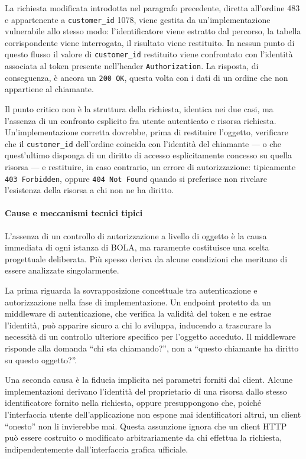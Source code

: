 La richiesta modificata introdotta nel paragrafo precedente, diretta all'ordine 483 e appartenente
a \texttt{customer\_id} 1078, viene gestita da un'implementazione vulnerabile allo stesso modo:
l'identificatore viene estratto dal percorso, la tabella corrispondente viene interrogata, il
risultato viene restituito. In nessun punto di questo flusso il valore di \texttt{customer\_id}
restituito viene confrontato con l'identità associata al token presente nell'header
\texttt{Authorization}. La risposta, di conseguenza, è ancora un \texttt{200 OK}, questa volta con
i dati di un ordine che non appartiene al chiamante.

Il punto critico non è la struttura della richiesta, identica nei due casi, ma l'assenza di un
confronto esplicito fra utente autenticato e risorsa richiesta. Un'implementazione corretta
dovrebbe, prima di restituire l'oggetto, verificare che il \texttt{customer\_id} dell'ordine
coincida con l'identità del chiamante --- o che quest'ultimo disponga di un diritto di accesso
esplicitamente concesso su quella risorsa --- e restituire, in caso contrario, un errore di
autorizzazione: tipicamente \texttt{403 Forbidden}, oppure \texttt{404 Not Found} quando si
preferisce non rivelare l'esistenza della risorsa a chi non ne ha diritto.

\paragraph{Cause e meccanismi tecnici tipici}

L'assenza di un controllo di autorizzazione a livello di oggetto è la causa immediata di ogni
istanza di BOLA, ma raramente costituisce una scelta progettuale deliberata. Più spesso deriva da
alcune condizioni che meritano di essere analizzate singolarmente.

La prima riguarda la sovrapposizione concettuale tra autenticazione e autorizzazione nella fase di
implementazione. Un endpoint protetto da un middleware di autenticazione, che verifica la validità
del token e ne estrae l'identità, può apparire sicuro a chi lo sviluppa, inducendo a trascurare la
necessità di un controllo ulteriore specifico per l'oggetto acceduto. Il middleware risponde alla
domanda ``chi sta chiamando?'', non a ``questo chiamante ha diritto su questo oggetto?''.

Una seconda causa è la fiducia implicita nei parametri forniti dal client. Alcune implementazioni
derivano l'identità del proprietario di una risorsa dallo stesso identificatore fornito nella
richiesta, oppure presuppongono che, poiché l'interfaccia utente dell'applicazione non espone mai
identificatori altrui, un client ``onesto'' non li invierebbe mai. Questa assunzione ignora che un
client HTTP può essere costruito o modificato arbitrariamente da chi effettua la richiesta,
indipendentemente dall'interfaccia grafica ufficiale.

